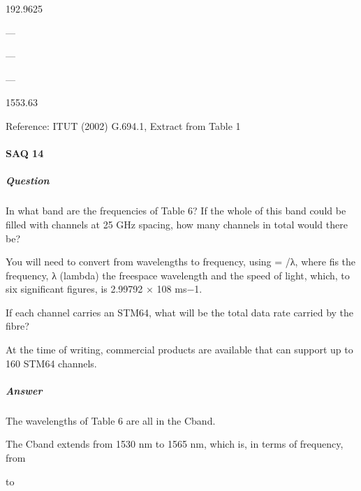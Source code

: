 \documentclass[letterpaper,10pt,english]{sphinxmanual}
\let\sphinxpxdimen\pdfpxdimen\else\newdimen\sphinxpxdimen
\begin{document}
192.9625





—





—





—





1553.63







Reference:  ITU\sphinxhyphen{}T (2002) G.694.1, Extract from Table 1






\paragraph{SAQ 14}
\label{\detokenize{content/session_00/Part_00_04:SAQ-14}}

\subparagraph{Question}
\label{\detokenize{content/session_00/Part_00_04:id4}}
In what band are the frequencies of Table 6? If the whole of this band could be filled with channels at 25 GHz spacing, how many channels in total would there be?

You will need to convert from wavelengths to frequency, using  = /λ, where fis the frequency, λ (lambda) the free\sphinxhyphen{}space wavelength and  the speed of light, which, to six significant figures, is 2.99792 × 108 ms−1.

If each channel carries an STM\sphinxhyphen{}64, what will be the total data rate carried by the fibre?

At the time of writing, commercial products are available that can support up to 160 STM\sphinxhyphen{}64 channels.


\subparagraph{Answer}
\label{\detokenize{content/session_00/Part_00_04:id5}}
The wavelengths of Table 6 are all in the C\sphinxhyphen{}band.

The C\sphinxhyphen{}band extends from 1530 nm to 1565 nm, which is, in terms of frequency, from

\sphinxincludegraphics[width=511\sphinxpxdimen,height=127\sphinxpxdimen]{{ue004i}.gif}

to
\end{document}
